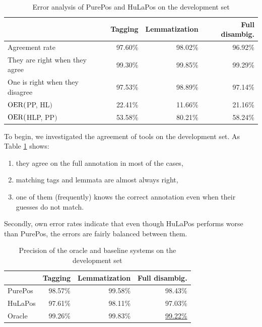 \begin{table}[H]
\centering
\caption{Error analysis of PurePos and HuLaPos on the development set}\label{tab:comb-disambig-comp}
\begin{tabular}{l r r r}
\hline
& Tagging & Lemmatization & Full disambig. \\
\hline
Agreement rate & 97.60\% & 98.02\% & 96.92\% \\
They are right when they agree & 99.30\% & 99.85\% & 99.29\% \\
One is right when they disagree & 97.53\% & 98.89\% & 97.14\% \\
$\operatorname{OER}($PP, HL$)$ & 22.41\% & 11.66\% & 21.16\% \\
$\operatorname{OER}($HLP, PP$)$ & 53.58\% & 80.21\% & 58.24\% \\
\hline
\end{tabular}
\end{table}

To begin, we investigated the agreement of tools on the development set.
As Table \ref{tab:comb-disambig-comp} shows:
\begin{enumerate}
 \item they agree on the full annotation in most of the cases,
 \item matching tags and lemmata are almost always right, 
 \item one of them (frequently) knows the correct annotation even when their guesses do not match.
\end{enumerate}

Secondly, own error rates indicate that even though HuLaPos performs worse than PurePos, the errors are fairly balanced between them. 

\begin{table}[H]
\centering
\caption{Precision of the oracle and baseline systems on the development set}\label{tab:comb-disambig-acc}
\begin{tabular}{l r r r}
\hline
& Tagging & Lemmatization & Full disambig. \\
\hline
PurePos & 98.57\% & 99.58\% & 98.43\% \\
HuLaPos & 97.61\% & 98.11\% & 97.03\% \\
Oracle & 99.26\% & 99.83\% & \underline{99.22\%} \\
\hline
\end{tabular}
\end{table}

